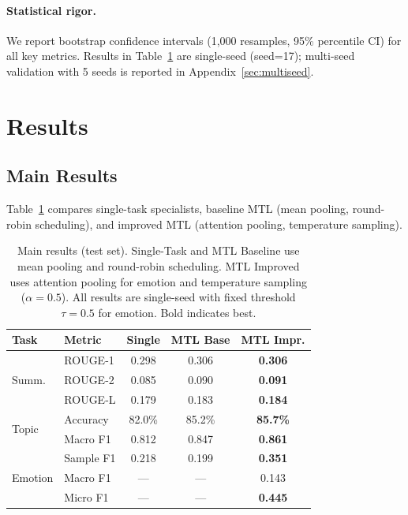 \documentclass[11pt]{article}
\begin{document}
\paragraph{Statistical rigor.} We report bootstrap confidence intervals (1,000 resamples, 95\% percentile CI) for all key metrics. Results in Table~\ref{tab:main_results} are single-seed (seed=17); multi-seed validation with 5 seeds is reported in Appendix~\ref{sec:multiseed}.

\section{Results}

\subsection{Main Results}

Table~\ref{tab:main_results} compares single-task specialists, baseline MTL (mean pooling, round-robin scheduling), and improved MTL (attention pooling, temperature sampling).

\begin{table}[t]
\centering
\caption{Main results (test set). Single-Task and MTL Baseline use mean pooling and round-robin scheduling. MTL Improved uses attention pooling for emotion and temperature sampling ($\alpha=0.5$). All results are single-seed with fixed threshold $\tau=0.5$ for emotion. Bold indicates best.}
\label{tab:main_results}
\small
\setlength{\tabcolsep}{4pt}
\begin{tabular}{llccc}
\toprule
\textbf{Task} & \textbf{Metric} & \textbf{Single} & \textbf{MTL Base} & \textbf{MTL Impr.} \\
\midrule
\multirow{3}{*}{Summ.} & ROUGE-1 & 0.298 & 0.306 & \textbf{0.306} \\
 & ROUGE-2 & 0.085 & 0.090 & \textbf{0.091} \\
 & ROUGE-L & 0.179 & 0.183 & \textbf{0.184} \\
\midrule
\multirow{2}{*}{Topic} & Accuracy & 82.0\% & 85.2\% & \textbf{85.7\%} \\
 & Macro F1 & 0.812 & 0.847 & \textbf{0.861} \\
\midrule
\multirow{3}{*}{Emotion} & Sample F1 & 0.218 & 0.199 & \textbf{0.351} \\
 & Macro F1 & --- & --- & 0.143 \\
 & Micro F1 & --- & --- & \textbf{0.445} \\
\bottomrule
\end{tabular}
\end{table}
\end{document}
